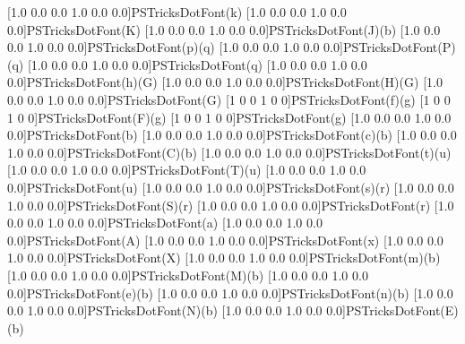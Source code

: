 \iffalse
\newpsfontdot{*}[2.77778 0.0 0.0 2.77778 -0.638889 -0.813889]{Symbol}{<B7>}
\newpsfontdot{o}[3.33333 0.0 0.0 3.33333 -0.666667 -1.78167]{Symbol}{<B0>}
\newpsfontdot{Bo}[4.69484 0.0 0.0 4.69484 -0.78169 -2.97418]{Times-Bold}{<CA>}
\fi
[1.0 0.0 0.0 1.0 0.0 0.0]{PSTricksDotFont}{(k)}
[1.0 0.0 0.0 1.0 0.0 0.0]{PSTricksDotFont}{(K)}
[1.0 0.0 0.0 1.0 0.0 0.0]{PSTricksDotFont}{(J)}{(b)}
%
[1.0 0.0 0.0 1.0 0.0 0.0]{PSTricksDotFont}{(p)}{(q)}
[1.0 0.0 0.0 1.0 0.0 0.0]{PSTricksDotFont}{(P)}{(q)}
[1.0 0.0 0.0 1.0 0.0 0.0]{PSTricksDotFont}{(q)}
[1.0 0.0 0.0 1.0 0.0 0.0]{PSTricksDotFont}{(h)}{(G)}
[1.0 0.0 0.0 1.0 0.0 0.0]{PSTricksDotFont}{(H)}{(G)}
[1.0 0.0 0.0 1.0 0.0 0.0]{PSTricksDotFont}{(G)}
[1 0 0 1 0 0]{PSTricksDotFont}{(f)}{(g)}
[1 0 0 1 0 0]{PSTricksDotFont}{(F)}{(g)}
[1 0 0 1 0 0]{PSTricksDotFont}{(g)}
%
[1.0 0.0 0.0 1.0 0.0 0.0]{PSTricksDotFont}{(b)}
[1.0 0.0 0.0 1.0 0.0 0.0]{PSTricksDotFont}{(c)}{(b)}
[1.0 0.0 0.0 1.0 0.0 0.0]{PSTricksDotFont}{(C)}{(b)}
[1.0 0.0 0.0 1.0 0.0 0.0]{PSTricksDotFont}{(t)}{(u)}
[1.0 0.0 0.0 1.0 0.0 0.0]{PSTricksDotFont}{(T)}{(u)}
[1.0 0.0 0.0 1.0 0.0 0.0]{PSTricksDotFont}{(u)}
[1.0 0.0 0.0 1.0 0.0 0.0]{PSTricksDotFont}{(s)}{(r)}
[1.0 0.0 0.0 1.0 0.0 0.0]{PSTricksDotFont}{(S)}{(r)}
[1.0 0.0 0.0 1.0 0.0 0.0]{PSTricksDotFont}{(r)}
[1.0 0.0 0.0 1.0 0.0 0.0]{PSTricksDotFont}{(a)}
[1.0 0.0 0.0 1.0 0.0 0.0]{PSTricksDotFont}{(A)}
[1.0 0.0 0.0 1.0 0.0 0.0]{PSTricksDotFont}{(x)}
[1.0 0.0 0.0 1.0 0.0 0.0]{PSTricksDotFont}{(X)}
[1.0 0.0 0.0 1.0 0.0 0.0]{PSTricksDotFont}{(m)}{(b)}
[1.0 0.0 0.0 1.0 0.0 0.0]{PSTricksDotFont}{(M)}{(b)}
[1.0 0.0 0.0 1.0 0.0 0.0]{PSTricksDotFont}{(e)}{(b)}
[1.0 0.0 0.0 1.0 0.0 0.0]{PSTricksDotFont}{(n)}{(b)}
[1.0 0.0 0.0 1.0 0.0 0.0]{PSTricksDotFont}{(N)}{(b)}
[1.0 0.0 0.0 1.0 0.0 0.0]{PSTricksDotFont}{(E)}{(b)}
